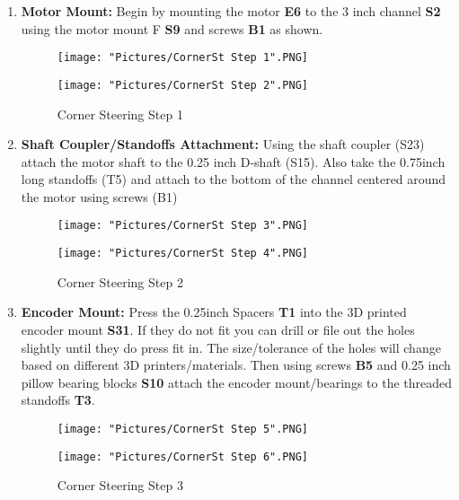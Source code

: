 \documentclass[12pt]{article}
\begin{document}
\begin{enumerate}
\item \textbf{Motor Mount:} Begin by mounting the motor \textbf{E6} to the 3 inch channel \textbf{S2} using the motor mount F \textbf{S9} and screws \textbf{B1} as shown. 

\begin{figure}[H]
  \centering
  \begin{minipage}[b]{0.45\textwidth}
    \texttt{[image: "Pictures/CornerSt Step 1".PNG]}
  \end{minipage}
  \hfill
  \begin{minipage}[b]{0.45\textwidth}
    \texttt{[image: "Pictures/CornerSt Step 2".PNG]}
  \end{minipage}
  \caption{Corner Steering Step 1}
\end{figure}

\item \textbf{Shaft Coupler/Standoffs Attachment:} Using the shaft coupler (S23) attach the motor shaft to the 0.25 inch D-shaft (S15). Also take the 0.75inch long standoffs (T5) and attach to the bottom of the channel centered around the motor using screws (B1) 

\begin{figure}[H]
  \centering
  \begin{minipage}[b]{0.45\textwidth}
    \texttt{[image: "Pictures/CornerSt Step 3".PNG]}
  \end{minipage}
  \hfill
  \begin{minipage}[b]{0.45\textwidth}
    \texttt{[image: "Pictures/CornerSt Step 4".PNG]}
  \end{minipage}
  \caption{Corner Steering Step 2}
\end{figure}

\item \textbf{Encoder Mount:} Press the 0.25inch Spacers \textbf{T1} into the 3D printed encoder mount \textbf{S31}. If they do not fit you can drill or file out the holes slightly until they do press fit in. The size/tolerance of the holes will change based on different 3D printers/materials. Then using screws \textbf{B5} and 0.25 inch pillow bearing blocks \textbf{S10} attach the encoder mount/bearings to the threaded standoffs \textbf{T3}.

\begin{figure}[H]
  \centering
  \begin{minipage}[b]{0.45\textwidth}
    \texttt{[image: "Pictures/CornerSt Step 5".PNG]}
  \end{minipage}
  \hfill
  \begin{minipage}[b]{0.45\textwidth}
    \texttt{[image: "Pictures/CornerSt Step 6".PNG]}
  \end{minipage}
  \caption{Corner Steering Step 3}
\end{figure}


\end{enumerate}
\end{document}
